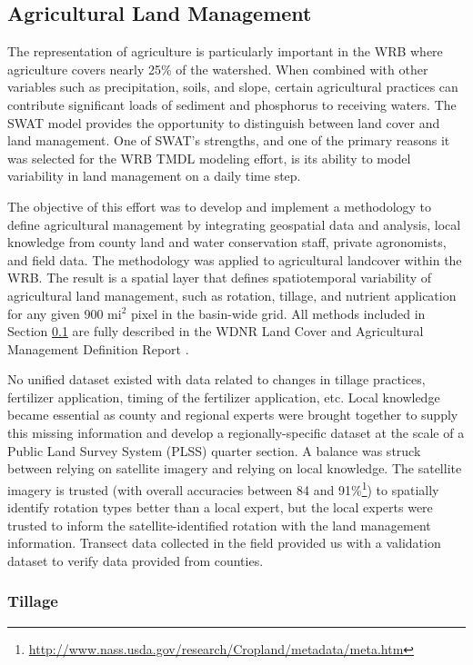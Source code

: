 \subsection{Agricultural Land Management}\label{sec:ag_land_mgt}
The representation of agriculture is particularly important in the WRB where agriculture covers nearly
25\% of the watershed. When combined with other variables such as precipitation, soils,
and slope, certain agricultural practices can contribute significant loads of sediment and phosphorus to receiving waters.  
The SWAT model provides the opportunity to distinguish between land cover and land management. 
One of SWAT’s strengths, and one of the primary reasons it was selected for the WRB TMDL modeling effort, is its ability to model variability in land management on a daily time step.

The objective of this effort was to develop and implement a methodology to define agricultural management by integrating geospatial data and analysis, local knowledge from county land and water conservation staff, private agronomists, and field data. The methodology was applied to agricultural landcover within the WRB. The result is a spatial layer that defines spatiotemporal variability of agricultural land management, such as rotation, tillage, and nutrient application for any given 900 mi$^2$ pixel in the basin-wide grid. All methods included in Section \ref{sec:ag_land_mgt} are fully described in the WDNR Land Cover and Agricultural Management Definition Report .

No unified dataset existed with data related to changes in tillage practices, fertilizer application, timing of the fertilizer application, etc.  Local knowledge became essential as county and regional experts were brought together to supply this missing information and develop a regionally-specific dataset at the scale of a Public Land Survey System (PLSS) quarter section. A balance was struck between relying on satellite imagery and relying on local knowledge. The satellite imagery is trusted (with overall accuracies between  84 and 91\%\footnote{\url{http://www.nass.usda.gov/research/Cropland/metadata/meta.htm}}) to spatially identify rotation types better than a local expert, but the local experts were trusted to inform the satellite-identified rotation with the land management information. Transect data collected in the field provided us with a validation dataset to verify data provided from counties.

\subsubsection{Tillage}

